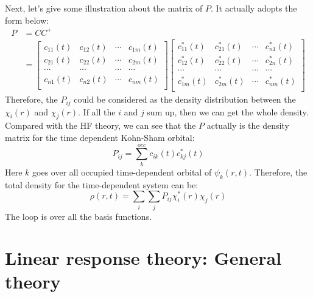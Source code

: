 Next, let's give some illustration about the matrix of $P$. It
actually adopts the form below:
\begin{align}\label{}
P &= CC^{+} \nonumber \\
  &= \begin{bmatrix}
     c_{11}(t) & c_{12}(t) & \cdots & c_{1m}(t) \\
     c_{21}(t) & c_{22}(t) & \cdots & c_{2m}(t) \\
     \cdots    &   \cdots  & \cdots & \cdots    \\
     c_{n1}(t) & c_{n2}(t) & \cdots & c_{nm}(t) \\
   \end{bmatrix}
\begin{bmatrix}
     c^{*}_{11}(t) & c^{*}_{21}(t) & \cdots & c^{*}_{n1}(t) \\
     c^{*}_{12}(t) & c^{*}_{22}(t) & \cdots & c^{*}_{2n}(t) \\
     \cdots        &   \cdots      & \cdots & \cdots        \\
     c^{*}_{1m}(t) & c^{*}_{2m}(t) & \cdots & c^{*}_{nm}(t) \\
   \end{bmatrix}
\end{align}
Therefore, the $P_{ij}$ could be considered as the density
distribution between the $\chi_{i}(r)$ and $\chi_{j}(r)$. If all the
$i$ and $j$ sum up, then we can get the whole density. Compared with
the HF theory, we can see that the $P$ actually is the density
matrix for the time dependent Kohn-Sham orbital:
\begin{equation}\label{}
P_{ij} = \sum_{k}^{occ}c_{ik}(t)c_{kj}^{*}(t)
\end{equation}
Here $k$ goes over all occupied time-dependent orbital of
$\psi_{k}(r,t)$. Therefore, the total density for the time-dependent
system can be:
\begin{equation}\label{TDDFT_Added_eq:5}
\rho(r,t) =\sum_{i}\sum_{j}P_{ij}\chi_{i}^{*}(r)\chi_{j}(r)
\end{equation}
The loop is over all the basis functions.

\section{Linear response theory: General theory}
%
%
%
%
